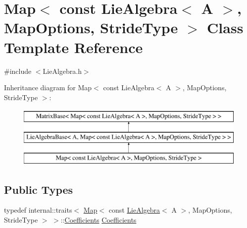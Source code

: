 \hypertarget{class_map_3_01const_01_lie_algebra_3_01_a_01_4_00_01_map_options_00_01_stride_type_01_4}{}\section{Map$<$ const Lie\+Algebra$<$ A $>$, Map\+Options, Stride\+Type $>$ Class Template Reference}
\label{class_map_3_01const_01_lie_algebra_3_01_a_01_4_00_01_map_options_00_01_stride_type_01_4}


{\ttfamily \#include $<$Lie\+Algebra.\+h$>$}

Inheritance diagram for Map$<$ const Lie\+Algebra$<$ A $>$, Map\+Options, Stride\+Type $>$\+:\begin{figure}[H]
\begin{center}
\leavevmode
\includegraphics[height=3.000000cm]{class_map_3_01const_01_lie_algebra_3_01_a_01_4_00_01_map_options_00_01_stride_type_01_4}
\end{center}
\end{figure}
\subsection*{Public Types}
\begin{DoxyCompactItemize}
\item 
typedef internal\+::traits$<$ \hyperlink{class_map_3_01const_01_lie_algebra_3_01_a_01_4_00_01_map_options_00_01_stride_type_01_4_a1f3c2cd540feb372191254760225bf1a}{Map}$<$ const \hyperlink{class_lie_algebra}{Lie\+Algebra}$<$ A $>$, Map\+Options, Stride\+Type $>$ $>$\+::\hyperlink{class_map_3_01const_01_lie_algebra_3_01_a_01_4_00_01_map_options_00_01_stride_type_01_4_a3173cdb7a49ee8a41f26cb0891740634}{Coefficients} \hyperlink{class_map_3_01const_01_lie_algebra_3_01_a_01_4_00_01_map_options_00_01_stride_type_01_4_a3173cdb7a49ee8a41f26cb0891740634}{Coefficients}
\end{DoxyCompactItemize}
